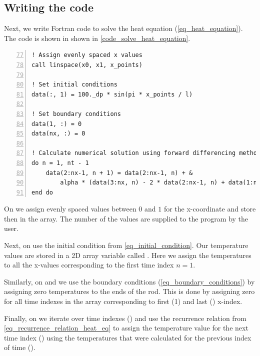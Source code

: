 \subsection{Writing the code}

Next, we write Fortran code to solve the heat equation (\autoref{eq_heat_equation}). The code is shown in shown in \autoref{code_solve_heat_equation}.


\noindent\begin{minipage}{\linewidth}
\begin{lstlisting}[caption={Solving a heat equation with forward-difference method (\code{heat\_equation.f90}).},frame=tlrb,label={code_solve_heat_equation}, numbers=left, firstnumber=77]
! Assign evenly spaced x values
call linspace(x0, x1, x_points)

! Set initial conditions
data(:, 1) = 100._dp * sin(pi * x_points / l)

! Set boundary conditions
data(1, :) = 0
data(nx, :) = 0

! Calculate numerical solution using forward differencing method
do n = 1, nt - 1
    data(2:nx-1, n + 1) = data(2:nx-1, n) + &
        alpha * (data(3:nx, n) - 2 * data(2:nx-1, n) + data(1:nx-2, n))
end do
\end{lstlisting}
\end{minipage}

On  we assign evenly spaced values between $0$ and $1$ for the x-coordinate and store then in the  array. The number of the values  are supplied to the program by the user.

Next, on  use the initial condition from \autoref{eq_initial_condition}. Our temperature values are stored in a 2D array variable called . Here we assign the temperatures to all the x-values corresponding to the first time index $n=1$.

Similarly, on  and  we use the boundary conditions (\autoref{eq_boundary_conditions}) by assigning zero temperatures to the ends of the rod. This is done by assigning zero for all time indexes in the  array corresponding to first (1) and last () x-index.

Finally, on  we iterate over time indexes () and use the recurrence relation from \autoref{eq_recurrence_relation_heat_eq} to assign the temperature value for the next time index () using the temperatures that were calculated for the previous index of time ().

